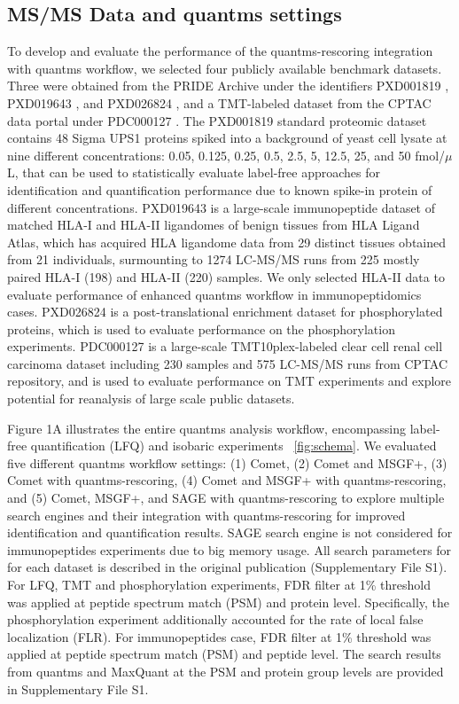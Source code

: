\documentclass[12pt]{article}
\begin{document}
\subsection{MS/MS Data and quantms settings}
To develop and evaluate the performance of the quantms-rescoring integration with quantms workflow, we selected four publicly available benchmark datasets. Three were obtained from the PRIDE Archive under the identifiers PXD001819 \cite{ramus_spiked_2016}, PXD019643 \cite{marcu_hla_2021}, and PXD026824 \cite{jacob_berger_irs1_2021}, and a TMT-labeled dataset from the CPTAC data portal under PDC000127 \cite{clark_integrated_2019}.
The PXD001819 standard proteomic dataset contains 48 Sigma UPS1 proteins spiked into a background of yeast cell lysate at nine different concentrations: 0.05, 0.125, 0.25, 0.5, 2.5, 5, 12.5, 25, and 50 fmol/$\mu$L, that can be used to statistically evaluate label-free approaches for identification and quantification performance due to known spike-in protein of different concentrations. PXD019643 is a large-scale immunopeptide dataset of matched HLA-I and HLA-II ligandomes of benign tissues from HLA Ligand Atlas, which has acquired HLA ligandome data from 29 distinct tissues obtained from 21 individuals, surmounting to 1274 LC-MS/MS runs from 225 mostly paired HLA-I (198) and HLA-II (220) samples. We only selected HLA-II data to evaluate performance of enhanced quantms workflow in immunopeptidomics cases. PXD026824 is a post-translational enrichment dataset for phosphorylated proteins, which is used to evaluate performance on the phosphorylation experiments. PDC000127 is a large-scale TMT10plex-labeled clear cell renal cell carcinoma dataset including 230 samples and 575 LC-MS/MS runs from CPTAC repository, and is used to evaluate performance on TMT experiments and explore potential for reanalysis of large scale public datasets.

Figure 1A illustrates the entire quantms analysis workflow, encompassing label-free quantification (LFQ) and isobaric experiments ~\ref{fig:schema}. We evaluated five different quantms workflow settings: (1) Comet, (2) Comet and MSGF+, (3) Comet with quantms-rescoring, (4) Comet and MSGF+ with quantms-rescoring, and (5) Comet, MSGF+, and SAGE with quantms-rescoring to explore multiple search engines and their integration with quantms-rescoring for improved identification and quantification results. SAGE search engine is not considered for immunopeptides experiments due to big memory usage. All search parameters for for each dataset is described in the original publication (Supplementary File S1). For LFQ, TMT and phosphorylation experiments, FDR filter at 1\% threshold was applied at peptide spectrum match (PSM) and protein level. Specifically, the phosphorylation experiment additionally accounted for the rate of local false localization (FLR). For immunopeptides case, FDR filter at 1\% threshold was applied at peptide spectrum match (PSM) and peptide level. The search results from quantms and MaxQuant at the PSM and protein group levels are provided in Supplementary File S1.
\end{document}
